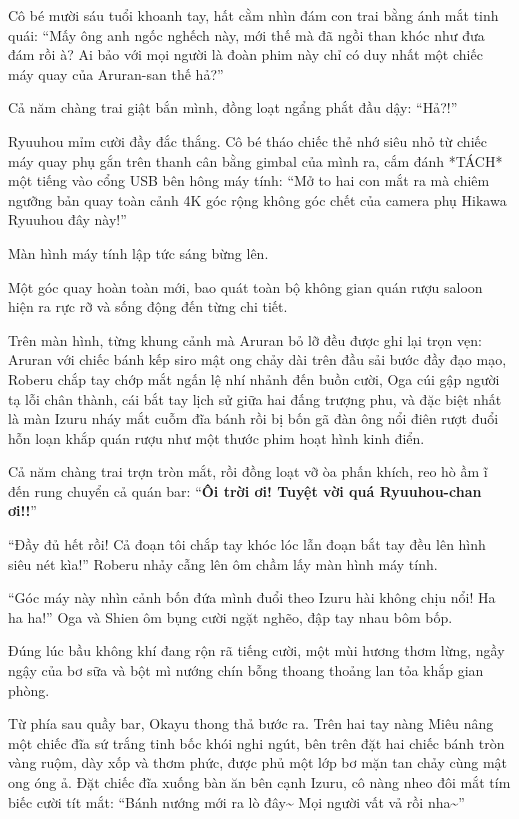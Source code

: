 \documentclass[../main.tex]{subfiles}
\begin{document}
Cô bé mười sáu tuổi khoanh tay, hất cằm nhìn đám con trai bằng ánh mắt tinh quái: ``Mấy ông anh ngốc nghếch này, mới thế mà đã ngồi than khóc như đưa đám rồi à? Ai bảo với mọi người là đoàn phim này chỉ có duy nhất một chiếc máy quay của Aruran-san thế hả?''

Cả năm chàng trai giật bắn mình, đồng loạt ngẩng phắt đầu dậy: ``Hả?!''

Ryuuhou mỉm cười đầy đắc thắng. Cô bé tháo chiếc thẻ nhớ siêu nhỏ từ chiếc máy quay phụ gắn trên thanh cân bằng gimbal của mình ra, cắm đánh *TÁCH* một tiếng vào cổng USB bên hông máy tính: ``Mở to hai con mắt ra mà chiêm ngưỡng bản quay toàn cảnh 4K góc rộng không góc chết của camera phụ Hikawa Ryuuhou đây này!''

Màn hình máy tính lập tức sáng bừng lên.

Một góc quay hoàn toàn mới, bao quát toàn bộ không gian quán rượu saloon hiện ra rực rỡ và sống động đến từng chi tiết.

Trên màn hình, từng khung cảnh mà Aruran bỏ lỡ đều được ghi lại trọn vẹn: Aruran với chiếc bánh kếp siro mật ong chảy dài trên đầu sải bước đầy đạo mạo, Roberu chắp tay chớp mắt ngấn lệ nhí nhảnh đến buồn cười, Oga cúi gập người tạ lỗi chân thành, cái bắt tay lịch sử giữa hai đấng trượng phu, và đặc biệt nhất là màn Izuru nháy mắt cuỗm đĩa bánh rồi bị bốn gã đàn ông nổi điên rượt đuổi hỗn loạn khắp quán rượu như một thước phim hoạt hình kinh điển.

Cả năm chàng trai trợn tròn mắt, rồi đồng loạt vỡ òa phấn khích, reo hò ầm ĩ đến rung chuyển cả quán bar: ``\textbf{Ôi trời ơi! Tuyệt vời quá Ryuuhou-chan ơi!!}''

``Đầy đủ hết rồi! Cả đoạn tôi chắp tay khóc lóc lẫn đoạn bắt tay đều lên hình siêu nét kìa!'' Roberu nhảy cẫng lên ôm chầm lấy màn hình máy tính.

``Góc máy này nhìn cảnh bốn đứa mình đuổi theo Izuru hài không chịu nổi! Ha ha ha!'' Oga và Shien ôm bụng cười ngặt nghẽo, đập tay nhau bôm bốp.

Đúng lúc bầu không khí đang rộn rã tiếng cười, một mùi hương thơm lừng, ngầy ngậy của bơ sữa và bột mì nướng chín bỗng thoang thoảng lan tỏa khắp gian phòng.

Từ phía sau quầy bar, Okayu thong thả bước ra. Trên hai tay nàng Miêu nâng một chiếc đĩa sứ trắng tinh bốc khói nghi ngút, bên trên đặt hai chiếc bánh tròn vàng ruộm, dày xốp và thơm phức, được phủ một lớp bơ mặn tan chảy cùng mật ong óng ả. Đặt chiếc đĩa xuống bàn ăn bên cạnh Izuru, cô nàng nheo đôi mắt tím biếc cười tít mắt: ``Bánh nướng mới ra lò đây\~{} Mọi người vất vả rồi nha\~{}''
\end{document}
